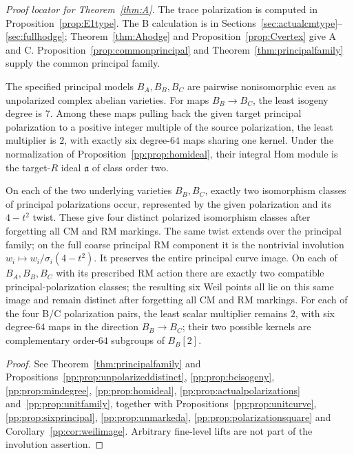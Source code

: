 \noindent\emph{Proof locator for Theorem~\ref{thm:A}.}
The trace polarization is computed in Proposition~\ref{prop:E1type}.
The B calculation is in Sections~\ref{sec:actualcmtype}--\ref{sec:fullhodge};
Theorem~\ref{thm:Ahodge} and Proposition~\ref{prop:Cvertex} give A and C.
Proposition~\ref{prop:commonprincipal} and
Theorem~\ref{thm:principalfamily} supply the common principal family.

\begin{theorem}
\label{pp:thm:introgeometry}
The specified principal models $B_A,B_B,B_C$ are pairwise nonisomorphic
even as unpolarized complex abelian varieties. For maps $B_B\to B_C$,
the least isogeny degree is $7$. Among these maps pulling back the given
target principal polarization to a positive integer multiple of the
source polarization, the least multiplier is $2$, with exactly six
degree-$64$ maps sharing one kernel. Under the normalization of
Proposition~\ref{pp:prop:homideal}, their integral Hom module is
the target-$R$ ideal $\mathfrak a$ of class order two.

On each of the two underlying varieties $B_B,B_C$, exactly two
isomorphism classes of principal polarizations occur, represented by
the given polarization and its $4-t^2$ twist. These give four distinct
polarized isomorphism classes after forgetting all CM and RM markings.
The same twist extends over the principal family; on the full coarse
principal RM component it is the nontrivial involution
$w_i\mapsto w_i/\sigma_i(4-t^2)$. It preserves the entire principal
curve image. On each of $B_A,B_B,B_C$ with its prescribed RM action
there are exactly two compatible principal-polarization classes;
the resulting six Weil points all lie on this same image and remain
distinct after forgetting all CM and RM markings. For each of the four
B/C polarization pairs, the least scalar multiplier remains $2$,
with six degree-$64$ maps in the direction $B_B\to B_C$; their two possible kernels are complementary
order-$64$ subgroups of $B_B[2]$.
\end{theorem}
\begin{proof}
See Theorem~\ref{thm:principalfamily} and
Propositions~\ref{pp:prop:unpolarizeddistinct},
\ref{pp:prop:bcisogeny}, \ref{pp:prop:mindegree},
\ref{pp:prop:homideal}, \ref{pp:prop:actualpolarizations}
and~\ref{pp:prop:unitfamily}, together with
Propositions~\ref{pp:prop:unitcurve}, \ref{pp:prop:sixprincipal},
\ref{pp:prop:unmarkeda}, \ref{pp:prop:polarizationsquare} and
Corollary~\ref{pp:cor:weilimage}. Arbitrary fine-level lifts are not
part of the involution assertion.
\end{proof}


